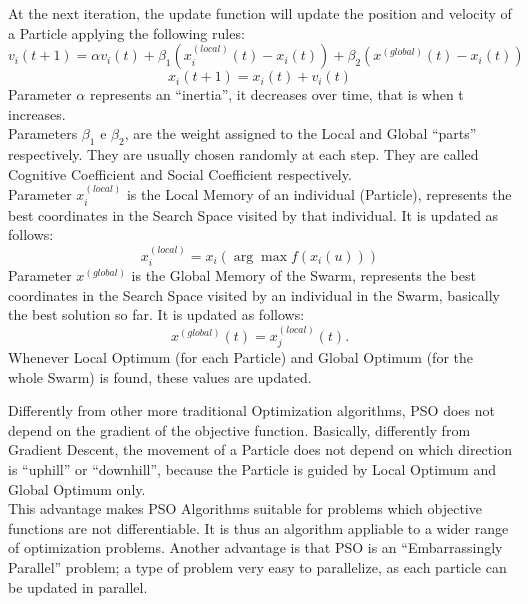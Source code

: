 At the next iteration, the update function will update the position and velocity of a Particle applying the following rules:
\begin{equation}
	v_i(t+1) = \alpha v_i(t) + \beta_1(x_i^{(local)}(t) - x_i(t)) + \beta_2(x^{(global)}(t) - x_i(t))
\end{equation}
\begin{equation}
	x_i(t+1) = x_i(t) + v_i(t)
\end{equation}
Parameter $\alpha$ represents an “inertia”, it decreases over time, that is when t increases.
\\[0.3cm]Parameters $\beta_1$ e $\beta_2$, are the weight assigned to the Local and Global “parts” respectively. They are usually chosen randomly at each step. They are called Cognitive Coefficient and Social Coefficient respectively.
\\[0.3cm]Parameter  $x_i^{(local)}$  is the Local Memory of an individual (Particle), represents the best coordinates in the Search Space visited by that individual. It is updated as follows:
\begin{equation}
	x_i^{(local)} = x_i(\arg \max f(x_i(u)))
\end{equation}
Parameter $x^{(global)}$ is the Global Memory of the Swarm, represents the best coordinates in the Search Space visited by an individual in the Swarm, basically the best solution so far. It is updated as follows:
\begin{equation}
	x^{(global)}(t) = x_j^{(local)}(t).
\end{equation}
Whenever Local Optimum (for each Particle) and Global Optimum (for the whole Swarm) is found, these values are updated.

Differently from other more traditional Optimization algorithms, PSO does not depend on the gradient of the objective function.
Basically, differently from Gradient Descent, the movement of a Particle does not depend on which direction is “uphill” or “downhill”, because the Particle is guided by Local Optimum and Global Optimum only.
\\[0.3cm]This advantage makes PSO Algorithms suitable for problems which objective functions are not differentiable. It is thus an algorithm appliable to a wider range of optimization problems.
Another advantage is that PSO is an “Embarrassingly Parallel” problem; a type of problem very easy to parallelize, as each particle can be updated in parallel.

